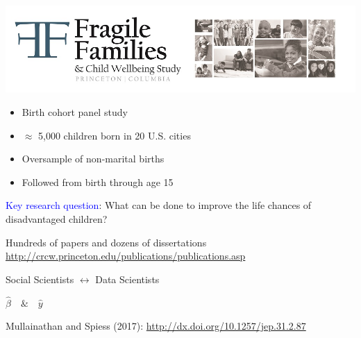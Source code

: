 \documentclass{beamer}
\begin{document}
\begin{frame}

\begin{center}
\includegraphics[width=\textwidth]{figures/ff_logo}
\end{center}

\begin{itemize}
\item Birth cohort panel study
\item $\approx$ 5,000 children born in 20 U.S. cities
\item Oversample of non-marital births 
\item Followed from birth through age 15
\end{itemize}

\textcolor{blue}{Key research question}: What can be done to improve the life chances of disadvantaged children?

\end{frame}
\begin{frame}

Hundreds of papers and dozens of dissertations \vskip 1cm
\scriptsize \url{http://crcw.princeton.edu/publications/publications.asp}

\end{frame}
\begin{frame}

\begin{center}
\large{Social Scientists $\longleftrightarrow$ Data Scientists}
\end{center}
\pause
\begin{center}
\LARGE{
$\hat{\beta} \quad \& \quad \hat{y}$
}
\end{center}

\vfill
Mullainathan and Spiess (2017): \url{http://dx.doi.org/10.1257/jep.31.2.87}
\end{frame}
\end{document}
